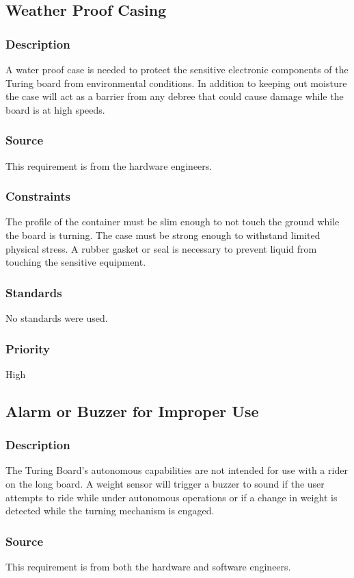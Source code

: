 \subsection{Weather Proof Casing}
\subsubsection{Description}
A water proof case is needed to protect the sensitive electronic components of the Turing board from environmental conditions. In addition to keeping out moisture the case will act as a barrier from any debree that could cause damage while the board is at high speeds.
\subsubsection{Source}
This requirement is from the hardware engineers.
\subsubsection{Constraints}
The profile of the container must be slim enough to not touch the ground while the board is turning. The case must be strong enough to withstand limited physical stress. A rubber gasket or seal is necessary to prevent liquid from touching the sensitive equipment.
\subsubsection{Standards}
No standards were used.
\subsubsection{Priority}
High

\subsection{Alarm or Buzzer for Improper Use}
\subsubsection{Description}
The Turing Board's autonomous capabilities are not intended for use with a rider on the long board. A weight sensor will trigger a buzzer to sound if the user attempts to ride while under autonomous operations or if a change in weight is detected while the turning mechanism is engaged.
\subsubsection{Source}
This requirement is from both the hardware and software engineers.
